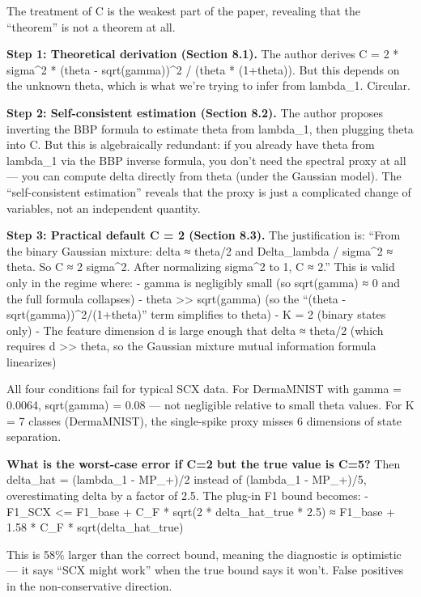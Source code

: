 \documentclass[
  12pt,
]{article}
\begin{document}
The treatment of C is the weakest part of the paper, revealing that the
``theorem'' is not a theorem at all.

\textbf{Step 1: Theoretical derivation (Section 8.1).} The author
derives C = 2 * sigma\^{}2 * (theta - sqrt(gamma))\^{}2 / (theta *
(1+theta)). But this depends on the unknown theta, which is what we're
trying to infer from lambda\_1. Circular.

\textbf{Step 2: Self-consistent estimation (Section 8.2).} The author
proposes inverting the BBP formula to estimate theta from lambda\_1,
then plugging theta into C. But this is algebraically redundant: if you
already have theta from lambda\_1 via the BBP inverse formula, you don't
need the spectral proxy at all --- you can compute delta directly from
theta (under the Gaussian model). The ``self-consistent estimation''
reveals that the proxy is just a complicated change of variables, not an
independent quantity.

\textbf{Step 3: Practical default C = 2 (Section 8.3).} The
justification is: ``From the binary Gaussian mixture: delta ≈ theta/2
and Delta\_lambda / sigma\^{}2 ≈ theta. So C ≈ 2 sigma\^{}2. After
normalizing sigma\^{}2 to 1, C ≈ 2.'' This is valid only in the regime
where: - gamma is negligibly small (so sqrt(gamma) ≈ 0 and the full
formula collapses) - theta \textgreater\textgreater{} sqrt(gamma) (so
the ``(theta - sqrt(gamma))\^{}2/(1+theta)'' term simplifies to theta) -
K = 2 (binary states only) - The feature dimension d is large enough
that delta ≈ theta/2 (which requires d \textgreater\textgreater{} theta,
so the Gaussian mixture mutual information formula linearizes)

All four conditions fail for typical SCX data. For DermaMNIST with gamma
= 0.0064, sqrt(gamma) = 0.08 --- not negligible relative to small theta
values. For K = 7 classes (DermaMNIST), the single-spike proxy misses 6
dimensions of state separation.

\textbf{What is the worst-case error if C=2 but the true value is C=5?}
Then delta\_hat = (lambda\_1 - MP\_+)/2 instead of (lambda\_1 -
MP\_+)/5, overestimating delta by a factor of 2.5. The plug-in F1 bound
becomes: - F1\_SCX \textless= F1\_base + C\_F * sqrt(2 *
delta\_hat\_true * 2.5) ≈ F1\_base + 1.58 * C\_F *
sqrt(delta\_hat\_true)

This is 58\% larger than the correct bound, meaning the diagnostic is
optimistic --- it says ``SCX might work'' when the true bound says it
won't. False positives in the non-conservative direction.
\end{document}
